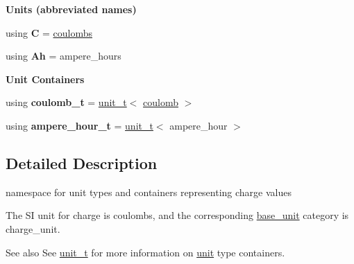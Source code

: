 \begin{Indent}{\bf Units (abbreviated names)}\par
\begin{DoxyCompactItemize}
\item 
\hypertarget{namespaceunits_1_1charge_a0fe0ee65845c206753e26aafdc047252}{}using {\bfseries C} = \hyperlink{structunits_1_1unit}{coulombs}\label{namespaceunits_1_1charge_a0fe0ee65845c206753e26aafdc047252}

\item 
\hypertarget{namespaceunits_1_1charge_aee4d36215f3375c9d20596d65ed63d34}{}using {\bfseries Ah} = ampere\+\_\+hours\label{namespaceunits_1_1charge_aee4d36215f3375c9d20596d65ed63d34}

\end{DoxyCompactItemize}
\end{Indent}
\begin{Indent}{\bf Unit Containers}\par
{\em \label{namespaceunits_1_1charge_chargeContainers}%
\hypertarget{namespaceunits_1_1charge_chargeContainers}{}%
}\begin{DoxyCompactItemize}
\item 
\hypertarget{namespaceunits_1_1charge_a7a7c9b00f4d13e37fbf4ba2b2ac1d08c}{}using {\bfseries coulomb\+\_\+t} = \hyperlink{classunits_1_1unit__t}{unit\+\_\+t}$<$ \hyperlink{structunits_1_1unit}{coulomb} $>$\label{namespaceunits_1_1charge_a7a7c9b00f4d13e37fbf4ba2b2ac1d08c}

\item 
\hypertarget{namespaceunits_1_1charge_aa5673c6a90dabfe7926daaf26afbd600}{}using {\bfseries ampere\+\_\+hour\+\_\+t} = \hyperlink{classunits_1_1unit__t}{unit\+\_\+t}$<$ ampere\+\_\+hour $>$\label{namespaceunits_1_1charge_aa5673c6a90dabfe7926daaf26afbd600}

\end{DoxyCompactItemize}
\end{Indent}


\subsection{Detailed Description}
namespace for unit types and containers representing charge values 

The S\+I unit for charge is {\ttfamily coulombs}, and the corresponding {\ttfamily \hyperlink{structunits_1_1base__unit}{base\+\_\+unit}} category is {\ttfamily charge\+\_\+unit}. \begin{DoxySeeAlso}{See also}
See \hyperlink{classunits_1_1unit__t}{unit\+\_\+t} for more information on \hyperlink{structunits_1_1unit}{unit} type containers. 
\end{DoxySeeAlso}
